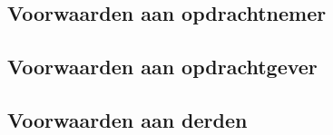 \subsection{Voorwaarden aan opdrachtnemer}


\subsection{Voorwaarden aan opdrachtgever}


\subsection{Voorwaarden aan derden}


